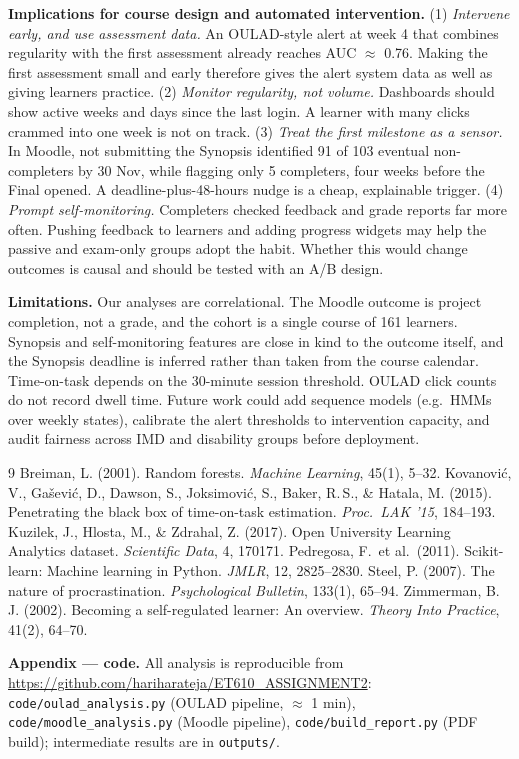\documentclass[10pt,a4paper]{article}
\newcommand{\repo}{https://github.com/hariharateja/ET610_ASSIGNMENT2}
\begin{document}
\textbf{Implications for course design and automated intervention.}
(1) \emph{Intervene early, and use assessment data.} An OULAD-style alert at week 4 that combines regularity with
the first assessment already reaches AUC $\approx$ 0.76. Making the first assessment small and early therefore gives
the alert system data as well as giving learners practice.
(2) \emph{Monitor regularity, not volume.} Dashboards should show active weeks and days since the last login. A
learner with many clicks crammed into one week is not on track.
(3) \emph{Treat the first milestone as a sensor.} In Moodle, not submitting the Synopsis identified 91 of 103
eventual non-completers by 30 Nov, while flagging only 5 completers, four weeks before the Final opened. A
deadline-plus-48-hours nudge is a cheap, explainable trigger.
(4) \emph{Prompt self-monitoring.} Completers checked feedback and grade reports far more often. Pushing feedback to
learners and adding progress widgets may help the passive and exam-only groups adopt the habit. Whether this would
change outcomes is causal and should be tested with an A/B design.

\textbf{Limitations.} Our analyses are correlational. The Moodle outcome is project completion, not a grade, and the
cohort is a single course of 161 learners. Synopsis and self-monitoring features are close in kind to the outcome
itself, and the Synopsis deadline is inferred rather than taken from the course calendar. Time-on-task depends on the 30-minute session threshold. OULAD click counts do not record dwell time. Future
work could add sequence models (e.g.\ HMMs over weekly states), calibrate the alert thresholds to intervention
capacity, and audit fairness across IMD and disability groups before deployment.

\begingroup
\footnotesize
\begin{thebibliography}{9}\setlength{\itemsep}{0pt}
 Breiman, L. (2001). Random forests. \emph{Machine Learning}, 45(1), 5--32.
 Kovanovi\'c, V., Ga\v{s}evi\'c, D., Dawson, S., Joksimovi\'c, S., Baker, R.\,S., \&
Hatala, M. (2015). Penetrating the black box of time-on-task estimation. \emph{Proc.\ LAK '15}, 184--193.
 Kuzilek, J., Hlosta, M., \& Zdrahal, Z. (2017). Open University Learning Analytics dataset.
\emph{Scientific Data}, 4, 170171.
 Pedregosa, F.\ et al.\ (2011). Scikit-learn: Machine learning in Python. \emph{JMLR}, 12,
2825--2830.
 Steel, P. (2007). The nature of procrastination. \emph{Psychological Bulletin}, 133(1), 65--94.
 Zimmerman, B.\,J. (2002). Becoming a self-regulated learner: An overview. \emph{Theory Into
Practice}, 41(2), 64--70.
\end{thebibliography}
\endgroup

{\footnotesize\textbf{Appendix --- code.} All analysis is reproducible from \url{\repo}:
\texttt{code/oulad\_analysis.py} (OULAD pipeline, $\approx$ 1 min), \texttt{code/moodle\_analysis.py} (Moodle
pipeline), \texttt{code/build\_report.py} (PDF build); intermediate results are in \texttt{outputs/}.\par}
\end{document}
